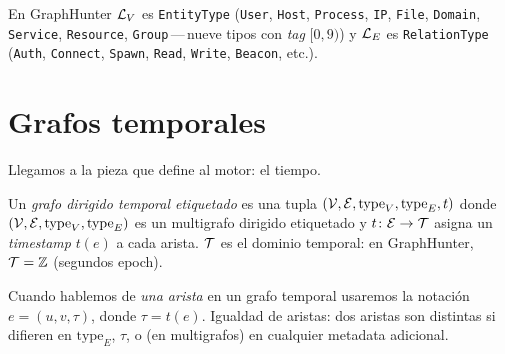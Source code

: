 En GraphHunter \(\mathcal{L}_V\) es \texttt{EntityType} (\texttt{User},
\texttt{Host}, \texttt{Process}, \texttt{IP}, \texttt{File},
\texttt{Domain}, \texttt{Service}, \texttt{Resource},
\texttt{Group}\,---\,nueve tipos con \emph{tag} \([0, 9)\)) y
\(\mathcal{L}_E\) es \texttt{RelationType} (\texttt{Auth},
\texttt{Connect}, \texttt{Spawn}, \texttt{Read}, \texttt{Write},
\texttt{Beacon}, etc.).

\section{Grafos temporales}

Llegamos a la pieza que define al motor: el tiempo.

\begin{definition}
Un \emph{grafo dirigido temporal etiquetado} es una tupla
\((\mathcal{V}, \mathcal{E}, \mathrm{type}_V, \mathrm{type}_E, t)\) donde
\((\mathcal{V}, \mathcal{E}, \mathrm{type}_V, \mathrm{type}_E)\) es un multigrafo
dirigido etiquetado y \(t \colon \mathcal{E} \to \mathcal{T}\) asigna un
\emph{timestamp} \(t(e)\) a cada arista. \(\mathcal{T}\) es el dominio
temporal: en GraphHunter, \(\mathcal{T} = \mathbb{Z}\) (segundos epoch).
\end{definition}

Cuando hablemos de \emph{una arista} en un grafo temporal usaremos la
notación \(e = (u, v, \tau)\), donde \(\tau = t(e)\). Igualdad de
aristas: dos aristas son distintas si difieren en
\(\mathrm{type}_E\), \(\tau\), o (en multigrafos) en cualquier
metadata adicional.

